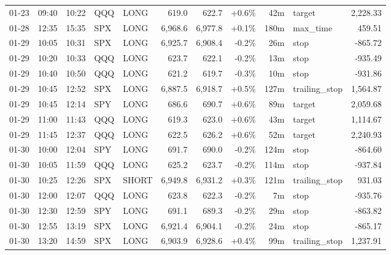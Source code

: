 \documentclass[11pt,a4paper,twoside]{article}
\begin{document}
\begin{center}
\begin{longtable}{>{\color{txtmain}}l l l l l r r r r >{\color{txtmain}}l r}
01-23 & 09:40 & 10:22 & QQQ & LONG & 619.0 & 622.7 & \textcolor{wingreen}{+0.6\%} & 42m & target & \textcolor{wingreen}{2,228.33} \\
01-28 & 12:35 & 15:35 & SPX & LONG & 6,968.6 & 6,977.8 & \textcolor{wingreen}{+0.1\%} & 180m & max\_time & \textcolor{wingreen}{459.51} \\
01-29 & 10:05 & 10:31 & SPX & LONG & 6,925.7 & 6,908.4 & \textcolor{lossred}{-0.2\%} & 26m & stop & \textcolor{lossred}{-865.72} \\
01-29 & 10:20 & 10:33 & QQQ & LONG & 623.7 & 622.1 & \textcolor{lossred}{-0.2\%} & 13m & stop & \textcolor{lossred}{-935.49} \\
01-29 & 10:40 & 10:50 & QQQ & LONG & 621.2 & 619.7 & \textcolor{lossred}{-0.3\%} & 10m & stop & \textcolor{lossred}{-931.86} \\
01-29 & 10:45 & 12:52 & SPX & LONG & 6,887.5 & 6,918.7 & \textcolor{wingreen}{+0.5\%} & 127m & trailing\_stop & \textcolor{wingreen}{1,564.87} \\
01-29 & 10:45 & 12:14 & SPY & LONG & 686.6 & 690.7 & \textcolor{wingreen}{+0.6\%} & 89m & target & \textcolor{wingreen}{2,059.68} \\
01-29 & 11:00 & 11:43 & QQQ & LONG & 619.3 & 623.0 & \textcolor{wingreen}{+0.6\%} & 43m & target & \textcolor{wingreen}{1,114.67} \\
01-29 & 11:45 & 12:37 & QQQ & LONG & 622.5 & 626.2 & \textcolor{wingreen}{+0.6\%} & 52m & target & \textcolor{wingreen}{2,240.93} \\
01-30 & 10:00 & 12:04 & SPY & LONG & 691.7 & 690.0 & \textcolor{lossred}{-0.2\%} & 124m & stop & \textcolor{lossred}{-864.60} \\
01-30 & 10:05 & 11:59 & QQQ & LONG & 625.2 & 623.7 & \textcolor{lossred}{-0.2\%} & 114m & stop & \textcolor{lossred}{-937.84} \\
01-30 & 10:25 & 12:26 & SPX & SHORT & 6,949.8 & 6,931.2 & \textcolor{wingreen}{+0.3\%} & 121m & trailing\_stop & \textcolor{wingreen}{931.03} \\
01-30 & 12:00 & 12:07 & QQQ & LONG & 623.8 & 622.3 & \textcolor{lossred}{-0.2\%} & 7m & stop & \textcolor{lossred}{-935.76} \\
01-30 & 12:30 & 12:59 & SPY & LONG & 691.1 & 689.3 & \textcolor{lossred}{-0.2\%} & 29m & stop & \textcolor{lossred}{-863.82} \\
01-30 & 12:55 & 13:19 & SPX & LONG & 6,921.4 & 6,904.1 & \textcolor{lossred}{-0.2\%} & 24m & stop & \textcolor{lossred}{-865.17} \\
01-30 & 13:20 & 14:59 & SPX & LONG & 6,903.9 & 6,928.6 & \textcolor{wingreen}{+0.4\%} & 99m & trailing\_stop & \textcolor{wingreen}{1,237.91} \\

\end{longtable}
\end{center}
\end{document}
